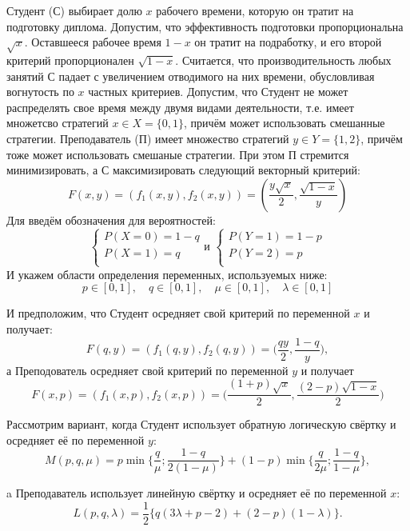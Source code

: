 \begin{flushleft}
Студент (С) выбирает долю $x$ рабочего времени, которую он тратит на подготовку диплома. Допустим, что эффективность подготовки пропорциональна $\sqrt{x}$. Оставшееся рабочее время $1-x$ он тратит на подработку, и его второй 
критерий пропорционален $\sqrt{1-x}$. Считается, что производительность любых занятий С падает с увеличением отводимого на них времени, обусловливая вогнутость по $x$ частных критериев. Допустим, что Студент не может распределять свое время между двумя 
видами деятельности, т.е. имеет множетсво стратегий $x\in X = \{0, 1\}$, причём может использовать смешанные стратегии.
Преподаватель (П) имеет множество стратегий $y \in Y=\{1, 2\}$, причём тоже может использовать смешаные стратегии.
При этом П стремится минимизировать, а С максимизировать следующий векторный критерий: 
\begin{equation}
F(x, y)=(f_1(x, y), f_2(x, y)) =(\frac{y \sqrt{x}}{2}, \frac{\sqrt{1-x}}{y})
\end{equation}
Для введём обозначения для вероятностей:
\[
\begin{cases}
P(X=0)=1-q \\
P(X=1)=q \\
\end{cases}
\textrm{и }
\begin{cases}
P(Y=1)=1-p \\
P(Y=2)=p \\
\end{cases}
\]
И укажем области определения переменных, используемых ниже:
\[
p \in [0, 1],\quad q \in [0, 1],\quad
\mu \in [0, 1],\quad \lambda \in [0, 1]
\]

И предположим, что Студент осредняет свой критерий по переменной $x$ и получает:
$$F(q, y)=(f_1(q, y), f_2(q, y)) =\big(\frac{q y}{2}, \frac{1-q}{y}\big),$$
а Преподователь осредняет свой критерий по переменной $y$ и получает
$$F(x, p)=(f_1(x, p), f_2(x, p)) =\big(\frac{(1+p)\sqrt{x}}{2}, \frac{(2-p)\sqrt{1-x}}{2}\big)$$

\vspace{5mm}

Рассмотрим вариант, когда Студент использует обратную логическую свёртку и осредняет её по переменной $y$:
\begin{equation} 
M(p,q,\mu)=p\min{\{\frac{q}{\mu};\frac{1-q}{2(1-\mu)}\}}+(1-p)\min\{\frac{q}{2\mu};\frac{1-q}{1-\mu}\},
\end{equation}

a Преподаватель использует линейную свёртку и осредняет её по переменной $x$:
\begin{equation} 
L(p,q,\lambda)=\frac{1}{2}\big \{q(3\lambda+p-2)+(2-p)(1-\lambda)\big \}.
\end{equation} 


\end{flushleft}
